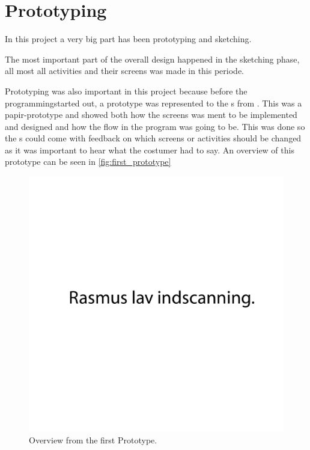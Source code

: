 \section{Prototyping}

In this project a very big part has been prototyping and sketching. 

The most important part of the overall design happened in the sketching phase, all most all activities and their screens was made in this periode. 

Prototyping was also important in this project because before the programmingstarted out, a prototype was represented to the \guardian{}s from \egebakken{}. This was a papir-prototype and showed both how the screens was ment to be implemented and designed and how the flow in the program was going to be. This was done so the \guardian{}s could come with feedback on which screens or activities should be changed as it was important to hear what the costumer had to say. An overview of this prototype can be seen in \autoref{fig:first_prototype}

\begin{figure}[h!]
	\centering
	\includegraphics[width=1\textwidth]{gfx/first-prototype.pdf}
	\caption{Overview from the first Prototype.}
	\label{fig:first_prototype}
\end{figure}
